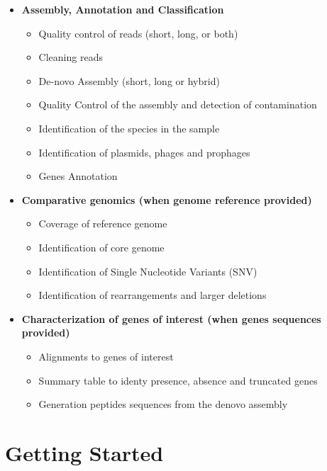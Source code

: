 \documentclass[
]{book}
\providecommand{\tightlist}{%
  \setlength{\itemsep}{0pt}\setlength{\parskip}{0pt}}
\begin{document}
\begin{itemize}
\tightlist
\item
  \textbf{Assembly, Annotation and Classification}

  \begin{itemize}
  \tightlist
  \item
    Quality control of reads (short, long, or both)
  \item
    Cleaning reads
  \item
    De-novo Assembly (short, long or hybrid)
  \item
    Quality Control of the assembly and detection of contamination
  \item
    Identification of the species in the sample
  \item
    Identification of plasmids, phages and prophages
  \item
    Genes Annotation
  \end{itemize}
\item
  \textbf{Comparative genomics (when genome reference provided)}

  \begin{itemize}
  \tightlist
  \item
    Coverage of reference genome
  \item
    Identification of core genome
  \item
    Identification of Single Nucleotide Variants (SNV)
  \item
    Identification of rearrangements and larger deletions
  \end{itemize}
\item
  \textbf{Characterization of genes of interest (when genes sequences provided)}

  \begin{itemize}
  \tightlist
  \item
    Alignments to genes of interest
  \item
    Summary table to identy presence, absence and truncated genes
  \item
    Generation peptides sequences from the denovo assembly
  \end{itemize}
\end{itemize}

\hypertarget{getting-started}{%
\chapter{Getting Started}\label{getting-started}}
\end{document}

